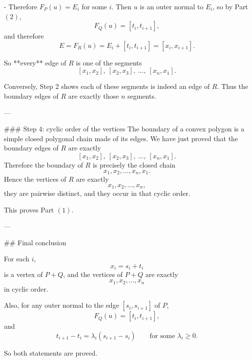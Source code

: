 - Therefore \(F_P(u)=E_i\) for some \(i\). Then \(u\) is an outer normal to \(E_i\), so by Part \((2)\),
  \[
  F_Q(u)=[t_i,t_{i+1}],
  \]
  and therefore
  \[
  E=F_R(u)=E_i+[t_i,t_{i+1}]=[x_i,x_{i+1}].
  \]

So **every** edge of \(R\) is one of the segments
\[
[x_1,x_2],\ [x_2,x_3],\ \dots,\ [x_n,x_1].
\]

Conversely, Step 2 shows each of these segments is indeed an edge of \(R\). Thus the boundary edges of \(R\) are exactly those \(n\) segments.

---

### Step 4: cyclic order of the vertices
The boundary of a convex polygon is a simple closed polygonal chain made of its edges.  
We have just proved that the boundary edges of \(R\) are exactly
\[
[x_1,x_2],\ [x_2,x_3],\ \dots,\ [x_n,x_1].
\]
Therefore the boundary of \(R\) is precisely the closed chain
\[
x_1,x_2,\dots,x_n,x_1.
\]
Hence the vertices of \(R\) are exactly
\[
x_1,x_2,\dots,x_n,
\]
they are pairwise distinct, and they occur in that cyclic order.

This proves Part \((1)\).

---

## Final conclusion

For each \(i\),
\[
x_i=s_i+t_i
\]
is a vertex of \(P+Q\), and the vertices of \(P+Q\) are exactly
\[
x_1,x_2,\dots,x_n
\]
in cyclic order.

Also, for any outer normal to the edge \([s_i,s_{i+1}]\) of \(P\),
\[
F_Q(u)=[t_i,t_{i+1}],
\]
and
\[
t_{i+1}-t_i=\lambda_i(s_{i+1}-s_i)\qquad\text{for some }\lambda_i\ge 0.
\]

So both statements are proved.